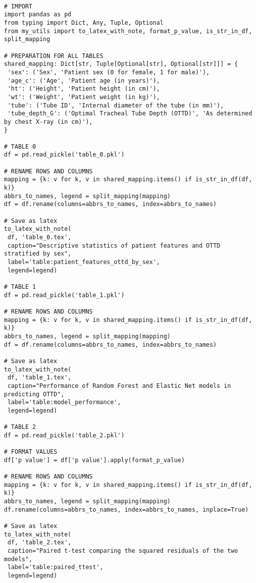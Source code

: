 \documentclass[11pt]{article}
\begin{document}
\begin{verbatim}

# IMPORT
import pandas as pd
from typing import Dict, Any, Tuple, Optional
from my_utils import to_latex_with_note, format_p_value, is_str_in_df, split_mapping

# PREPARATION FOR ALL TABLES
shared_mapping: Dict[str, Tuple[Optional[str], Optional[str]]] = {
 'sex': ('Sex', 'Patient sex (0 for female, 1 for male)'),
 'age_c': ('Age', 'Patient age (in years)'),
 'ht': ('Height', 'Patient height (in cm)'),
 'wt': ('Weight', 'Patient weight (in kg)'),
 'tube': ('Tube ID', 'Internal diameter of the tube (in mm)'),
 'tube_depth_G': ('Optimal Tracheal Tube Depth (OTTD)', 'As determined by chest X-ray (in cm)'),
}

# TABLE 0
df = pd.read_pickle('table_0.pkl')

# RENAME ROWS AND COLUMNS
mapping = {k: v for k, v in shared_mapping.items() if is_str_in_df(df, k)}
abbrs_to_names, legend = split_mapping(mapping)
df = df.rename(columns=abbrs_to_names, index=abbrs_to_names)

# Save as latex
to_latex_with_note(
 df, 'table_0.tex',
 caption="Descriptive statistics of patient features and OTTD stratified by sex", 
 label='table:patient_features_ottd_by_sex',
 legend=legend)

# TABLE 1
df = pd.read_pickle('table_1.pkl')

# RENAME ROWS AND COLUMNS
mapping = {k: v for k, v in shared_mapping.items() if is_str_in_df(df, k)}
abbrs_to_names, legend = split_mapping(mapping)
df = df.rename(columns=abbrs_to_names, index=abbrs_to_names)

# Save as latex
to_latex_with_note(
 df, 'table_1.tex',
 caption="Performance of Random Forest and Elastic Net models in predicting OTTD", 
 label='table:model_performance',
 legend=legend)

# TABLE 2
df = pd.read_pickle('table_2.pkl')

# FORMAT VALUES
df['p value'] = df['p value'].apply(format_p_value)

# RENAME ROWS AND COLUMNS
mapping = {k: v for k, v in shared_mapping.items() if is_str_in_df(df, k)}
abbrs_to_names, legend = split_mapping(mapping)
df.rename(columns=abbrs_to_names, index=abbrs_to_names, inplace=True)

# Save as latex
to_latex_with_note(
 df, 'table_2.tex',
 caption="Paired t-test comparing the squared residuals of the two models", 
 label='table:paired_ttest',
 legend=legend)

\end{verbatim}
\end{document}
